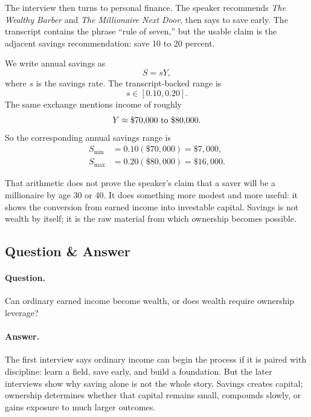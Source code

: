 The interview then turns to personal finance. The speaker recommends \emph{The Wealthy Barber} and \emph{The Millionaire Next Door}, then says to save early. The transcript contains the phrase ``rule of seven,'' but the usable claim is the adjacent savings recommendation: save 10 to 20 percent.

We write annual savings as
\begin{equation}
S=sY,
\end{equation}
where \(s\) is the savings rate. The transcript-backed range is
\begin{equation}
s\in[0.10,0.20].
\end{equation}
The same exchange mentions income of roughly
\begin{equation}
Y\approx \$70{,}000 \hbox{ to } \$80{,}000.
\end{equation}
So the corresponding annual savings range is
\begin{align}
S_{\min} &=0.10(\$70{,}000)=\$7{,}000,\\
S_{\max} &=0.20(\$80{,}000)=\$16{,}000.
\end{align}

That arithmetic does not prove the speaker's claim that a saver will be a millionaire by age 30 or 40. It does something more modest and more useful: it shows the conversion from earned income into investable capital. Savings is not wealth by itself; it is the raw material from which ownership becomes possible.

\subsection{Question \& Answer}

\paragraph{Question.}
Can ordinary earned income become wealth, or does wealth require ownership leverage?

\paragraph{Answer.}
The first interview says ordinary income can begin the process if it is paired with discipline: learn a field, save early, and build a foundation. But the later interviews show why saving alone is not the whole story. Savings creates capital; ownership determines whether that capital remains small, compounds slowly, or gains exposure to much larger outcomes.

